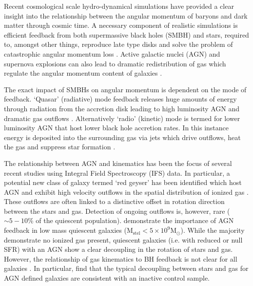 \documentclass[fleqn,usenatbib]{mnras}
\begin{document}
Recent cosmological scale hydro-dynamical simulations have provided a clear insight into the relationship between the angular momentum of baryons and dark matter through cosmic time. A necessary component of realistic simulations is efficient feedback from both supermassive black holes (SMBH) and stars, required to, amongst other things, reproduce late type disks and solve the problem of catastrophic angular momentum loss \citep[e.g.][]{zavala2008, scannapieco2009}. Active galactic nuclei (AGN) and supernova explosions can also lead to dramatic redistribution of gas which regulate the angular momentum content of galaxies \citep[e.g.][]{genel2015, DeFelippis2017}. 

The exact impact of SMBHs on angular momentum is dependent on the mode of feedback. `Quasar' (radiative) mode feedback releases huge amounts of energy through radiation from the accretion disk leading to high luminosity AGN and dramatic gas outflows \citep[e.g.][]{cattaneo2009, rubin2014, cheung2016}. Alternatively `radio' (kinetic) mode is termed for lower luminosity AGN that host lower black hole accretion rates. In this instance energy is deposited into the surrounding gas via jets which drive outflows, heat the gas and suppress star formation \citep[][]{binney1995, ciotti2001, heckman2014}.

The relationship between AGN and kinematics has been the focus of several recent studies using Integral Field Spectroscopy (IFS) data. In particular, a potential new class of galaxy termed `red geyser' has been identified which host AGN and exhibit high velocity outflows in the spatial distribution of ionized gas \citep[][]{cheung2016, roy2018}. These outflows are often linked to a distinctive offset in rotation direction between the stars and gas. Detection of ongoing outflows is, however, rare ($\sim5-10$\% of the quiescent population). \citet{penny2018} demonstrate the importance of AGN feedback in low mass quiescent galaxies ($\mathrm{M_{stel} < 5 \times 10^{9}M_{\odot}}$). While the majority demonstrate no ionized gas present, quiescent galaxies (i.e. with reduced or null SFR) with an AGN show a clear decoupling in the rotation of stars and gas. However, the relationship of gas kinematics to BH feedback is not clear for all galaxies \citep[see also:][]{koudmani2019}. In particular, \citet{ilha2019} find that the typical decoupling between stars and gas for AGN defined galaxies are consistent with an inactive control sample. 
\end{document}
